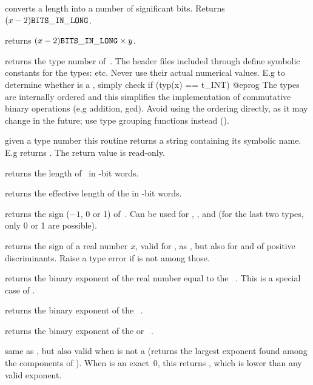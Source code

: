  converts a  length into a number
of significant bits. Returns $(x - 2){\tt BITS\_IN\_LONG}$.

 returns $(x - 2){\tt BITS\_IN\_LONG} \times y$.


 returns the type number of~. The header files
included through  define symbolic constants for the 
types:  etc. Never use their actual numerical values. E.g to determine
whether  is a , simply check
\bprog
  if (typ(x) == t_INT) { }
@eprog\noindent
The types are internally ordered and this simplifies the implementation of
commutative binary operations (e.g addition, gcd). Avoid using the ordering
directly, as it may change in the future; use type grouping functions
instead ().

 given a type number  this routine
returns a string containing its symbolic name. E.g 
returns . The return value is read-only.

 returns the length of~ in \B-bit words.

 returns the effective length of the 
 in \B-bit words.

 returns the sign ($-1$, 0 or 1) of~. Can be
used for , ,  and  (for the last two
types, only 0 or 1 are possible).

 returns the sign of a real number $x$,
valid for ,  as , but also for 
and  of positive discriminants. Raise a type error if 
is not among those.

 returns the binary exponent of the real number equal
to the ~. This is a special case of .

 returns the binary exponent of the
~.

 returns the binary exponent of the 
or ~.

 same as , but also valid when 
is not a  (returns the largest exponent found among the components
of ). When  is an exact~0, this returns
\hbox{}, which is lower than any valid exponent.

